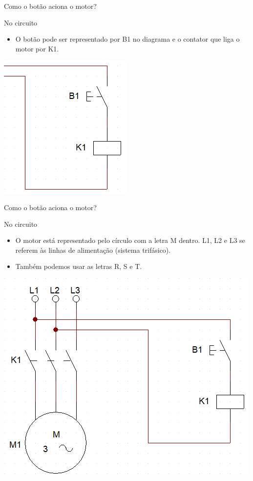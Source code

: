 \begin{frame}{Como o botão aciona o motor?}
	\begin{block}{No circuito}
		\begin{itemize}
			\item O botão pode ser representado por B1 no diagrama e o contator que liga o motor por K1.
		\end{itemize}
	\end{block}
	\centerline{\includegraphics[width=0.4\linewidth]{Figuras/Ch05/fig6.jpg}}
\end{frame}


\begin{frame}{Como o botão aciona o motor?}
	\begin{block}{No circuito}
		\begin{itemize}
			\item O motor está representado pelo círculo com a letra M dentro. L1, L2 e  L3 se referem às linhas de alimentação (sistema trifásico). 
			\item Também podemos usar as letras R, S e T.
		\end{itemize}
	\end{block}
	\centerline{\includegraphics[height=0.6\textheight]{Figuras/Ch05/fig7.jpg}}
\end{frame}


